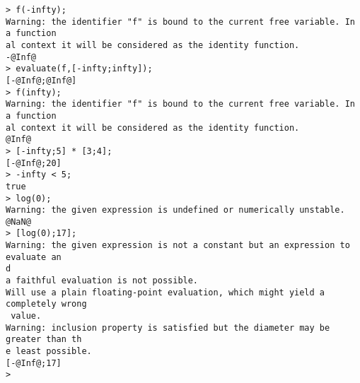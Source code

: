 \begin{center}\begin{minipage}{15cm}\begin{Verbatim}[frame=single]
> f(-infty);
Warning: the identifier "f" is bound to the current free variable. In a function
al context it will be considered as the identity function.
-@Inf@
> evaluate(f,[-infty;infty]);
[-@Inf@;@Inf@]
> f(infty);
Warning: the identifier "f" is bound to the current free variable. In a function
al context it will be considered as the identity function.
@Inf@
> [-infty;5] * [3;4];
[-@Inf@;20]
> -infty < 5;
true
> log(0);
Warning: the given expression is undefined or numerically unstable.
@NaN@
> [log(0);17];
Warning: the given expression is not a constant but an expression to evaluate an
d
a faithful evaluation is not possible.
Will use a plain floating-point evaluation, which might yield a completely wrong
 value.
Warning: inclusion property is satisfied but the diameter may be greater than th
e least possible.
[-@Inf@;17]
> 
\end{Verbatim}
\end{minipage}\end{center}
